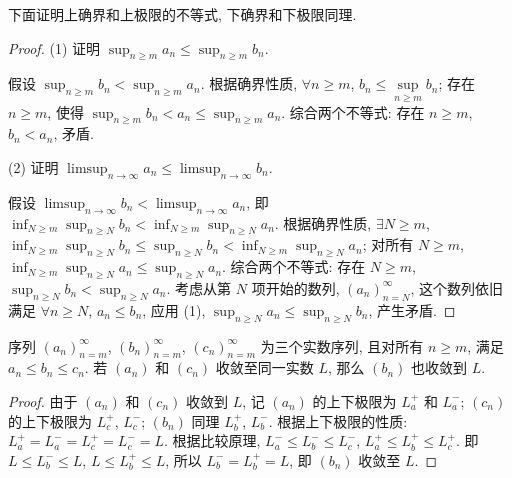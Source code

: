 \documentclass[UTF8]{ctexart}
\theoremstyle{mystyle}
\theoremstyle{myremark}
\theoremstyle{plain}
\begin{document}
下面证明上确界和上极限的不等式, 下确界和下极限同理.

\begin{proof}
    (1) 证明 $\displaystyle \sup_{n \geqslant m} a_n \leqslant \sup_{n \geqslant m} b_n $.

    假设 $ \displaystyle \sup_{n \geqslant m} b_n < \sup_{n \geqslant m} a_n $. 根据确界性质, $ \forall n \geqslant m $, $ b_n \leqslant \sup\limits_{n \geqslant m} b_n $; 存在 $ n \geqslant m $, 使得 $ \displaystyle \sup_{n \geqslant m} b_n < a_n \leqslant \sup_{n \geqslant m} a_n $. 综合两个不等式: 存在 $ n \geqslant m $, $ b_n < a_n $, 矛盾.

    (2) 证明 $\displaystyle \limsup_{n \to \infty} a_n \leqslant \limsup_{n \to \infty} b_n $.

    假设 $\displaystyle \limsup_{n \to \infty} b_n < \limsup_{n \to \infty} a_n $, 即 $\displaystyle \inf_{N \geqslant m} \sup_{n \geqslant N} b_n < \inf_{N \geqslant m} \sup_{n \geqslant N} a_n $. 根据确界性质, $ \exists N \geqslant m $, $\displaystyle \inf_{N \geqslant m} \sup_{n \geqslant N} b_n \leqslant \sup_{n \geqslant N} b_n < \inf_{N \geqslant m} \sup_{n \geqslant N} a_n $; 对所有 $ N \geqslant m $, $\displaystyle \inf_{N \geqslant m} \sup_{n \geqslant N} a_n \leqslant \sup_{n \geqslant N} a_n $. 综合两个不等式: 存在 $ N \geqslant m $, $ \displaystyle \sup_{n \geqslant N} b_n < \sup_{n \geqslant N} a_n $. 考虑从第 $ N $ 项开始的数列, $ (a_n)_{n = N}^\infty $, 这个数列依旧满足 $ \forall n \geqslant N $, $ a_n \leqslant b_n $, 应用 (1), $\displaystyle \sup_{n \geqslant N} a_n \leqslant \sup_{n \geqslant N} b_n $, 产生矛盾.
\end{proof}

\begin{theorem}
    序列 $ (a_n)_{n = m}^\infty $, $ (b_n)_{n = m}^\infty $, $ (c_n)_{n = m}^\infty $ 为三个实数序列, 且对所有 $ n \geqslant m $, 满足 $ a_n \leqslant b_n \leqslant c_n $. 若 $ (a_n) $ 和 $ (c_n) $ 收敛至同一实数 $ L $, 那么 $ (b_n) $ 也收敛到 $ L $.
\end{theorem}

\begin{proof}
    由于 $ (a_n) $ 和 $ (c_n) $ 收敛到 $ L $, 记 $ (a_n) $ 的上下极限为 $ L_a^+ $ 和 $ L_a^- $; $ (c_n) $ 的上下极限为 $ L_c^+ $, $ L_c^- $; $ (b_n) $ 同理 $ L_b^+ $, $ L_b^- $. 根据上下极限的性质: $ L_a^+ = L_a^- = L_c^+ = L_c^- = L $. 根据比较原理, $ L_a^- \leqslant L_b^- \leqslant L_c^- $, $ L_a^+ \leqslant L_b^+ \leqslant L_c^+ $. 即 $ L \leqslant L_b^- \leqslant L $, $ L \leqslant L_b^+ \leqslant L $, 所以 $ L_b^- = L_b^+ = L $, 即 $ (b_n) $ 收敛至 $ L $.
\end{proof}
\end{document}
